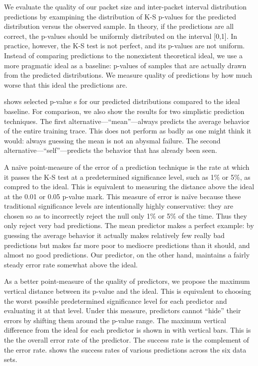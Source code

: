 \documentclass[conference]{IEEEtran}
\begin{document}

We evaluate the quality of our packet size and inter-packet interval distribution predictions by exampining the distribution of K-S p-values for the predicted distribution versus the observed sample.
In theory, if the predictions are all correct, the p-values should be uniformly distributed on the interval [0,1].
In practice, however, the K-S test is not perfect, and its p-values are not uniform.
Instead of comparing predictions to the nonexistent theoretical ideal, we use a more pragmatic ideal as a baseline:
p-values of samples that are actually drawn from the predicted distributions.
We measure quality of predictions by how much worse that this ideal the predictions are.\ksidealnote

 shows selected p-value s for our predicted distributions compared to the ideal baseline.
For comparison, we also show the results for two simplistic prediction techniques.
The first alternative---``mean''---always predicts the average behavior of the entire training trace.
This does not perform as badly as one might think it would:
always guessing the mean is not an abysmal failure.
The second alternative---``self''---predicts the behavior that has already been seen.

A na\"ive point-measure of the error of a prediction technique is the rate at which it passes the K-S test at a predetermined significance level, such as 1\% or 5\%, as compred to the ideal.
This is equivalent to measuring the distance above the ideal  at the 0.01 or 0.05 p-value mark.
This measure of error is na\"ive because these traditional significance levels are intentionally highly conservative:
they are chosen so as to incorrectly reject the null only 1\% or 5\% of the time.
Thus they only reject very bad predictions.
The mean predictor makes a perfect example:
by guessing the average behavior it actually makes relatively few really bad predictions but makes far more poor to mediocre predictions than it should, and almost no good predictions.
Our predictor, on the other hand, maintains a fairly steady error rate somewhat above the ideal.

As a better point-measure of the quality of predictors, we propose the maximum vertical distance between its p-value  and the ideal.
This is equivalent to choosing the worst possible predetermined significance level for each predictor and evaluating it at that level.
Under this measure, predictors cannot ``hide'' their errors by shifting them around the p-value range.
The maximum vertical difference from the ideal for each predictor is shown in  with vertical bars.
This is the the overall error rate of the predictor.
The success rate is the complement of the error rate.
 shows the success rates of various predictions across the six data sets.
\end{document}
